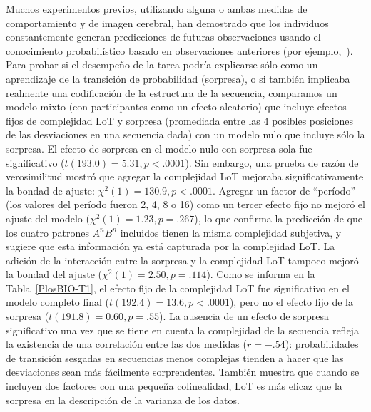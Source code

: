 Muchos experimentos previos, utilizando alguna o ambas medidas de comportamiento y de imagen cerebral, han demostrado que los individuos constantemente generan predicciones de futuras observaciones usando el conocimiento probabilístico basado en observaciones anteriores (por ejemplo,~\cite{f19,f20}). Para probar si el desempeño de la tarea podría explicarse sólo como un aprendizaje de la transición de probabilidad (sorpresa), o si también implicaba realmente una codificación de la estructura de la secuencia, comparamos un modelo mixto (con participantes como un efecto aleatorio) que incluye efectos fijos de complejidad LoT y sorpresa (promediada entre las 4 posibles posiciones de las desviaciones en una secuencia dada) con un modelo nulo que incluye sólo la sorpresa. El efecto de sorpresa en el modelo nulo con sorpresa sola fue significativo ($t(193.0) = 5.31, p < .0001$). Sin embargo, una prueba de razón de verosimilitud mostró que agregar la complejidad LoT mejoraba significativamente la bondad de ajuste: $\chi^2(1) = 130.9, p < .0001$. Agregar un factor de ``período'' (los valores del período fueron 2, 4, 8 o 16) como un tercer efecto fijo no mejoró el ajuste del modelo ($\chi^2(1) = 1.23, p = .267$), lo que confirma la predicción de que los cuatro patrones $A^n B^n$ incluidos tienen la misma complejidad subjetiva, y sugiere que esta información ya está capturada por la complejidad LoT. La adición de la interacción entre la sorpresa y la complejidad LoT tampoco mejoró la bondad del ajuste ($\chi^2(1) = 2.50, p = . 114$). Como se informa en la Tabla~\ref{PlosBIO-T1}, el efecto fijo de la complejidad LoT fue significativo en el modelo completo final ($t(192.4) = 13.6, p < .0001$), pero no el efecto fijo de la sorpresa ($t (191.8) = 0.60, p = .55$). La ausencia de un efecto de sorpresa significativo una vez que se tiene en cuenta la complejidad de la secuencia refleja la existencia de una correlación entre las dos medidas ($r = -.54$): probabilidades de transición sesgadas en secuencias menos complejas tienden a hacer que las desviaciones sean más fácilmente sorprendentes. También muestra que cuando se incluyen dos factores con una pequeña colinealidad, LoT es más eficaz que la sorpresa en la descripción de la varianza de los datos.


